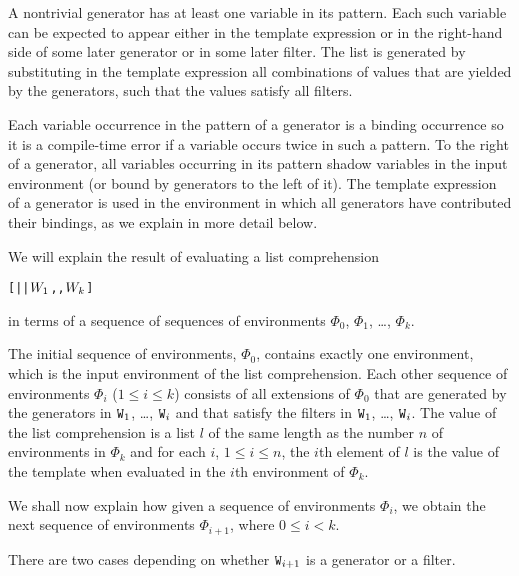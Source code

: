 A nontrivial generator has at least one variable in its pattern.  Each
such variable can be expected to appear either in the template
expression or in the right-hand side of some later generator or in
some later filter.  The list is generated by substituting in the
template expression all combinations of values that are yielded by the
generators, such that the values satisfy all filters.

Each variable occurrence in the pattern of a generator is a binding
occurrence so it is a compile-time error if a variable occurs twice in such a pattern.
To the right of a generator, all variables occurring in its pattern shadow variables in
the input environment (or bound by generators to the left  of it).
The template expression of a generator is used in the environment in which all
generators have contributed their bindings, as we explain in more detail below.

\EVALUATION

We will explain the result of evaluating a list comprehension
\begin{alltt}
[  || \(\Z{W}\sb{1}\),\tdots,\(\Z{W}\sb{k}\) ]
\end{alltt}
in terms of a sequence of sequences of environments $\Phi_0$,
$\Phi_1$, \ldots, $\Phi_k$.

The initial sequence of environments, $\Phi_0$, contains exactly one
environment, which is the input environment of the list comprehension.
Each other sequence of environments $\Phi_i$ ($1\leq i\leq k$) consists
of all extensions of $\Phi_0$ that are generated by the generators in
${\tt{\sl W}}_1$, \ldots, ${\tt{\sl W}}_i$ and that satisfy the filters in
${\tt{\sl W}}_1$, \ldots, ${\tt{\sl W}}_i$.  The value of the list comprehension
is a list $l$ of the same length as the number $n$ of environments in
$\Phi_k$ and for each $i$, $1\leq i\leq n$, the $i$th element of $l$
is the value of the template  when evaluated in the $i$th environment of
$\Phi_k$.

We shall now explain how given a sequence of environments $\Phi_i$,
we obtain the next sequence of environments $\Phi_{i+1}$, where
$0\leq i<k$.

There are two cases depending on whether ${\tt{\sl W}}_{i+1}$ is a generator
or a filter.


